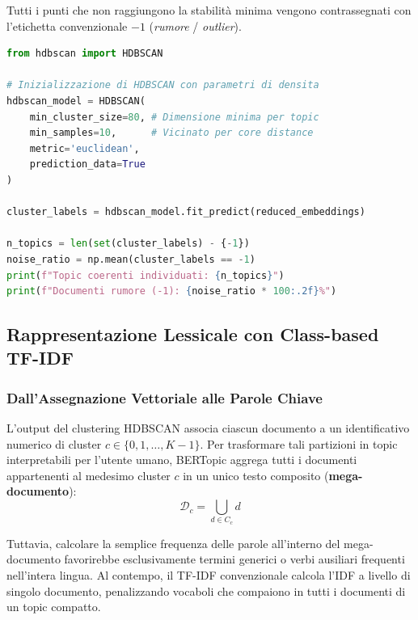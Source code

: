 Tutti i punti che non raggiungono la stabilità minima vengono contrassegnati con l'etichetta convenzionale \textbf{$-1$} (\textit{rumore} / \textit{outlier}).

\begin{lstlisting}[language=Python, caption={Clustering dei vettori ridotti tramite HDBSCAN.}]
from hdbscan import HDBSCAN

# Inizializzazione di HDBSCAN con parametri di densita
hdbscan_model = HDBSCAN(
    min_cluster_size=80, # Dimensione minima per topic
    min_samples=10,      # Vicinato per core distance
    metric='euclidean',
    prediction_data=True
)

cluster_labels = hdbscan_model.fit_predict(reduced_embeddings)

n_topics = len(set(cluster_labels) - {-1})
noise_ratio = np.mean(cluster_labels == -1)
print(f"Topic coerenti individuati: {n_topics}")
print(f"Documenti rumore (-1): {noise_ratio * 100:.2f}%")
\end{lstlisting}

\FloatBarrier
\subsection{Rappresentazione Lessicale con Class-based TF-IDF}
\label{sec:lab-ctfidf}

\FloatBarrier
\subsubsection{Dall'Assegnazione Vettoriale alle Parole Chiave}
\label{subsec:lab-ctfidf-formulation}

L'output del clustering HDBSCAN associa ciascun documento a un identificativo numerico di cluster $c \in \{0, 1, \dots, K-1\}$. Per trasformare tali partizioni in topic interpretabili per l'utente umano, BERTopic aggrega tutti i documenti appartenenti al medesimo cluster $c$ in un unico testo composito (\textbf{mega-documento}):
\begin{equation}
    \mathcal{D}_c = \bigcup_{d \in C_c} d
\end{equation}

Tuttavia, calcolare la semplice frequenza delle parole all'interno del mega-documento favorirebbe esclusivamente termini generici o verbi ausiliari frequenti nell'intera lingua. Al contempo, il TF-IDF convenzionale calcola l'IDF a livello di singolo documento, penalizzando vocaboli che compaiono in tutti i documenti di un topic compatto.

